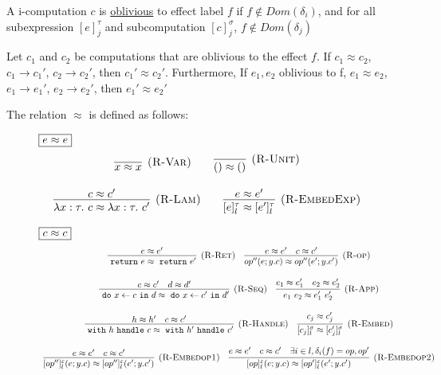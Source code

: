 \begin{definition}
A i-computation $c$ is \underline{oblivious} to effect label $f$ if $f \not\in Dom(\delta_i)$, and for all subexpression $[e]^\tau_j$ and subcomputation $[c]^\sigma_j$, $f \not\in Dom(\delta_j)$
\end{definition}


\begin{theorem} 

Let $c_1$ and $c_2$ be computations that are oblivious to the effect $f$.  If $c_1 \approx c_2$, $c_1 \rightarrow c_1'$, $c_2 \rightarrow c_2'$, then $c_1' \approx c_2'$. Furthermore,  If $e_1, e_2$ oblivious to f, $e_1 \approx e_2$, $e_1 \rightarrow e_1'$, $e_2 \rightarrow e_2'$, then $e_1' \approx e_2'$

The relation $\approx$ is defined as follows:
\begin{figure}[H]
\flushleft
\footnotesize{

$\fbox{$e \approx e$}$
\[
\begin{array}{c}
\infer[\textsc{(R-Var)}]{x \approx x}
{} \qquad \infer[\textsc{(R-Unit)}]{() \approx ()}{} \\[3ex]
\infer[\textsc{(R-Lam)}]{\lambda x:\tau.\ c \approx \lambda x:\tau.\ c'}{c \approx c'} \qquad
\infer[\textsc{(R-EmbedExp)}]{[e]^\tau_l \approx [e']^\tau_l}{e \approx e'}
\end{array}
\]


$\fbox{$c \approx c$}$
\[
\begin{array}{c}
\infer[\textsc{(R-Ret)}]
  {\m{return} e \approx \m{return} e'}
  {e \approx e'}  
  \quad 
\infer[\textsc{(R-op)}]
  {op''(e; y.c) \approx op''(e'; y.c')}
  {e \approx e' & c \approx c'}
  \\[3ex]
\infer[\textsc{(R-Seq)}]
  {\m{do} x \leftarrow c \m{in} d \approx \m{do} x \leftarrow c' \m{in} d'}
  {c \approx c' & d  \approx d'} \quad
\infer[\textsc{(R-App)}]
  {e_1\ e_2 \approx e_1'\ e_2'}
  {e_1 \approx e_1' & e_2 \approx e_2'} \\[3ex]
\infer[\textsc{(R-Handle)}]
  {\m{with} h \m{handle} c \approx \m{with} h' \m{handle} c'}
  {h \approx h' & c \approx c'} \quad 
\infer[\textsc{(R-Embed)}]
  {[c_j]^\sigma_l \approx [c_j']^\sigma_l}
  {c_j \approx c_j'} \\[3ex]

\infer[\textsc{(R-Embedop1)}]
  {[op'']^\varepsilon_l(e; y.c) \approx [op'']^\varepsilon_l(e'; y.c')}
  {e \approx e' & c \approx c'}
  \quad
\infer[\textsc{(R-Embedop2)}]
  {[op]^\varepsilon_l(e; y.c) \approx [op']^\varepsilon_l(e'; y.c')}
  {e \approx e' & c \approx c' & \exists i \in l, \delta_i(f) = op, op'} \\[3ex]
\end{array}
\]

}
\end{figure}
\end{theorem}
